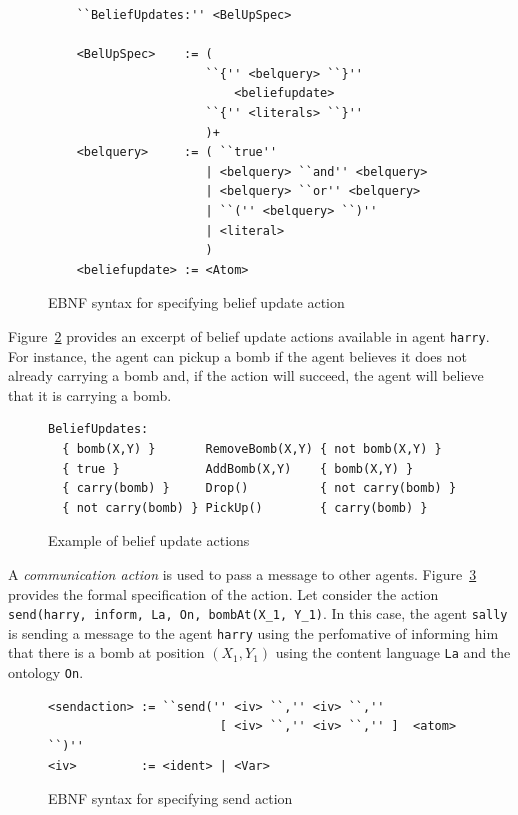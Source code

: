 \documentclass[a4paper]{article}
\begin{document}
\begin{figure}[htp]
\begin{verbatim}
	``BeliefUpdates:'' <BelUpSpec>
	
	<BelUpSpec>    := (
	                  ``{'' <belquery> ``}''
	                      <beliefupdate>
	                  ``{'' <literals> ``}''
	                  )+
	<belquery>     := ( ``true'' 
	                  | <belquery> ``and'' <belquery>
	                  | <belquery> ``or'' <belquery>
	                  | ``('' <belquery> ``)''
	                  | <literal>
	                  )
	<beliefupdate> := <Atom>
\end{verbatim}
\caption{EBNF syntax for specifying belief update action}
\label{fig:ebnf_beliefupdate}
\end{figure}

Figure~\ref{fig:example_beliefupdate} provides an excerpt of belief update actions available in agent \texttt{harry}. For instance, the agent can pickup a bomb if the agent believes it does not already carrying a bomb and, if the action will succeed, the agent will believe that it is carrying a bomb. %

\begin{figure}[htp]
\begin{verbatim}
BeliefUpdates:
  { bomb(X,Y) }       RemoveBomb(X,Y) { not bomb(X,Y) }
  { true }            AddBomb(X,Y)    { bomb(X,Y) }
  { carry(bomb) }     Drop()          { not carry(bomb) }
  { not carry(bomb) } PickUp()        { carry(bomb) }
\end{verbatim}
\caption{Example of belief update actions}
\label{fig:example_beliefupdate}
\end{figure}

A \emph{communication action} is used to pass a message to other agents. Figure~\ref{fig:ebnf_sendaction} provides the formal specification of the action. Let consider the action \texttt{send(harry, inform, La, On, bombAt(X\_1, Y\_1)}. In this case, the agent \texttt{sally} is sending a message to the agent \texttt{harry} using the perfomative of informing him that there is a bomb at position $(X_1, Y_1)$ using the content language \texttt{La} and the ontology \texttt{On}.

\begin{figure}[htp]
\begin{verbatim}
<sendaction> := ``send('' <iv> ``,'' <iv> ``,''
                        [ <iv> ``,'' <iv> ``,'' ]  <atom> ``)''  
<iv>         := <ident> | <Var>
\end{verbatim}
\caption{EBNF syntax for specifying send action}
\label{fig:ebnf_sendaction}
\end{figure}
\end{document}
